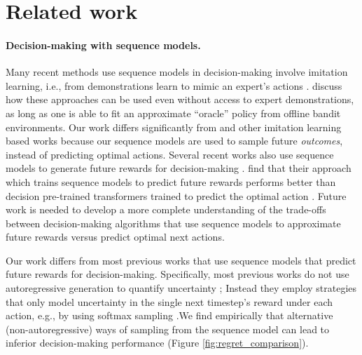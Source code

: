 \section{Related work}
\label{sec:related-work}

\paragraph{Decision-making with sequence models.}
Many recent methods use sequence models in decision-making involve imitation learning, i.e., from demonstrations learn to mimic an expert's actions \citep{decisionTransformer,janner2021offline,hussein2017imitation}. \citet{lee2023incontext} discuss how these approaches can be used even without access to expert demonstrations, as long as one is able to fit an approximate ``oracle'' policy from offline bandit environments. Our work differs significantly from \citet{lee2023incontext} and other imitation learning based works because our sequence models are used to sample future \textit{outcomes}, instead of predicting optimal actions. 
Several recent works also use sequence models to generate future rewards for decision-making \citep{mukherjee2024pretraining,NguyenGr22, MullerHoArGrHu22, GarneloRoMaRaSaShTeReEs18,liu2016prior}. \citet{mukherjee2024pretraining} find that their approach which trains sequence models to predict future rewards performs better than decision pre-trained transformers trained to predict the optimal action \citep{lee2023incontext}. Future work is needed to develop a more complete understanding of the trade-offs between decision-making algorithms that use sequence models to approximate future rewards versus predict optimal next actions.

Our work differs from most previous works that use sequence models that predict future rewards for decision-making. Specifically, most previous works do not use autoregressive generation to quantify uncertainty \citep{mukherjee2024pretraining,NguyenGr22, MullerHoArGrHu22, GarneloRoMaRaSaShTeReEs18}; Instead they employ strategies that only model uncertainty in the single next timestep's reward under each action, e.g., by using softmax sampling \citep{mukherjee2024pretraining}.We find empirically that alternative (non-autoregressive) ways of sampling from the sequence model can lead to inferior decision-making performance (Figure \ref{fig:regret_comparison}). 


